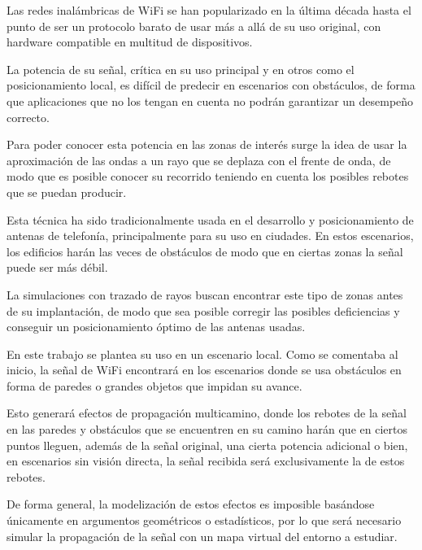 Las redes inalámbricas de WiFi se han popularizado en la última década hasta el punto de ser un protocolo barato de usar más a allá de su uso original, con hardware compatible en multitud de dispositivos.

La potencia de su señal, crítica en su uso principal y en otros como el posicionamiento local, es difícil de predecir en escenarios con obstáculos, de forma que aplicaciones que no los tengan en cuenta no podrán garantizar un desempeño correcto.

Para poder conocer esta potencia en las zonas de interés surge la idea de usar la aproximación de las ondas a un rayo que se deplaza con el frente de onda, de modo que es posible conocer su recorrido teniendo en cuenta los posibles rebotes que se puedan producir.

Esta técnica ha sido tradicionalmente usada en el desarrollo y posicionamiento de antenas de telefonía, principalmente para su uso en ciudades.
En estos escenarios, los edificios harán las veces de obstáculos de modo que en ciertas zonas la señal puede ser más débil.

La simulaciones con trazado de rayos buscan encontrar este tipo de zonas antes de su implantación, de modo que sea posible corregir las posibles deficiencias y conseguir un posicionamiento óptimo de las antenas usadas.

En este trabajo se plantea su uso en un escenario local.
Como se comentaba al inicio, la señal de WiFi encontrará en los escenarios donde se usa obstáculos en forma de paredes o grandes objetos que impidan su avance.

Esto generará efectos de propagación multicamino, donde los rebotes de la señal en las paredes y obstáculos que se encuentren en su camino harán que en ciertos puntos lleguen, además de la señal original, una cierta potencia adicional o bien, en escenarios sin visión directa, la señal recibida será exclusivamente la de estos rebotes.

De forma general, la modelización de estos efectos es imposible basándose únicamente en argumentos geométricos o estadísticos, por lo que será necesario simular la propagación de la señal con un mapa virtual del entorno a estudiar. 
